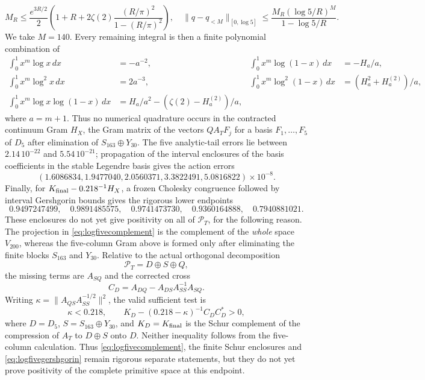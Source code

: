 \documentclass[11pt]{amsart}
\theoremstyle{definition}
\theoremstyle{remark}
\begin{document}
\[
 M_R\le \frac{e^{3R/2}}2
 \left(1+R+2\zeta(2)\frac{(R/\pi)^2}{1-(R/\pi)^2}\right),
\quad
 \|q-q_{<M}\|_{[0,\log5]}
 \le \frac{M_R(\log5/R)^M}{1-\log5/R}.
\]
We take \(M=140\).  Every remaining integral is then a finite polynomial
combination of
\[
\begin{aligned}
 \int_0^1x^m\log x\,dx&=-a^{-2},&
 \int_0^1x^m\log(1-x)\,dx&=-H_a/a,\\
 \int_0^1x^m\log^2x\,dx&=2a^{-3},&
 \int_0^1x^m\log^2(1-x)\,dx&=(H_a^2+H_a^{(2)})/a,\\
 \int_0^1x^m\log x\log(1-x)\,dx
 &=H_a/a^2-(\zeta(2)-H_a^{(2)})/a,
\end{aligned}
\]
where \(a=m+1\).  Thus no numerical quadrature occurs in the contracted
continuum Gram \(H_X\), the Gram matrix of the vectors \(QA_TF_j\) for a
basis \(F_1,\dots,F_5\) of \(D_5\) after elimination of
\(S_{163}\oplus Y_{30}\).  The five analytic-tail errors lie between
\(2.14\,10^{-22}\) and \(5.54\,10^{-21}\); propagation of the interval
enclosures of the basis coefficients in the stable Legendre basis gives the action
errors
\[
 (1.6086834,1.9477040,2.0560371,3.3822491,5.0816822)\times10^{-8}.
\]
Finally, for \(K_{\rm final}-0.218^{-1}H_X\), a frozen Cholesky
congruence followed by interval Gershgorin bounds gives the rigorous lower
endpoints
\begin{equation}\label{eq:logfivegershgorin}
 0.9497247499,\quad0.9891485575,\quad0.9741473730,\quad
 0.9360164888,\quad0.7940881021.
\end{equation}
These enclosures do not yet give positivity on all of \(\mathcal P_T\), for
the following reason.  The projection in \eqref{eq:logfivecomplement} is the complement of the
\emph{whole} space \(V_{200}\), whereas the five-column Gram above is formed
only after eliminating the finite blocks \(S_{163}\) and \(Y_{30}\).  Relative to the actual
orthogonal decomposition
\[
 \mathcal P_T=D\oplus S\oplus Q,
\]
the missing terms are \(A_{SQ}\) and the corrected cross
\[
 C_D=A_{DQ}-A_{DS}A_{SS}^{-1}A_{SQ}.
\]
Writing \(\kappa=\|A_{QS}A_{SS}^{-1/2}\|^2\), the valid sufficient test is
\[
 \kappa<0.218,
 \qquad
 K_D-(0.218-\kappa)^{-1}C_DC_D^*>0,
\]
where \(D=D_5\), \(S=S_{163}\oplus Y_{30}\), and \(K_D=K_{\rm final}\) is the
Schur complement of the compression of \(A_T\) to \(D\oplus S\) onto \(D\).
Neither inequality follows from the five-column calculation.  Thus
\eqref{eq:logfivecomplement}, the finite Schur enclosures and
\eqref{eq:logfivegershgorin} remain rigorous separate statements, but they
do not yet prove positivity of the complete primitive space at this
endpoint.
\end{document}
